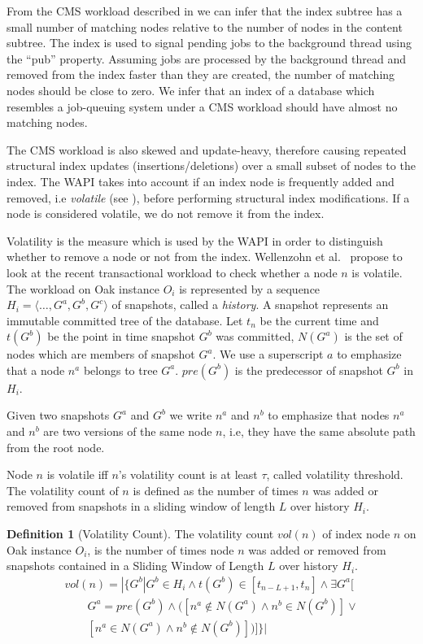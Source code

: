 \documentclass[abstracton,12pt]{scrartcl}
\theoremstyle{definition}
\newtheorem{definition}{Definition}
\begin{document}
From the CMS workload described in  we can infer that the index subtree has a small number of
matching nodes relative to the number of nodes in the content subtree. The index is
 used to signal pending jobs to the background thread using
the ``pub'' property. Assuming jobs are processed by
the background thread and removed from the index faster than they are created,
the number of matching nodes should be close to zero. We infer that an index of
a database which resembles a job-queuing system under a CMS workload should have
almost no matching nodes. 

The CMS workload is also skewed and update-heavy, therefore causing repeated structural index
updates (insertions/deletions) over a small subset of nodes to the index.
The WAPI takes into account if an index node is frequently added and removed,
i.e \textit{volatile} (see ), before performing structural
index modifications. If a node is considered volatile, we do not remove it from the index.

Volatility is the measure which is used by the WAPI in order to distinguish
whether to remove a node or not from the index.
Wellenzohn et al.~\cite{KW17} propose to look at the recent transactional
workload to check whether a node $n$ is volatile. The workload on Oak instance
$O_i$ is represented by a sequence $H_i = \langle \ldots, G^a, G^b, G^c
\rangle$ of snapshots, called a \textit{history}. A snapshot represents an immutable
committed tree of the database. Let $t_n$ be the current time and
$t(G^b)$ be the point in time snapshot $G^b$ was committed, $N(G^a)$ is the
set of nodes which are members of snapshot $G^a$. We use a superscript $a$
to emphasize that a node $n^a$ belongs to tree $G^a$. $pre(G^b)$ is the
predecessor of snapshot $G^b$ in $H_i$.

Given two snapshots $G^a$ and $G^b$ we write $n^a$ and $n^b$ to emphasize that
nodes $n^a$ and $n^b$ are two versions of the same node $n$, i.e, they have
the same absolute path from the root node.

Node $n$ is volatile iff $n$'s volatility count is at least $\tau$, called
volatility threshold. The volatility count of $n$ is defined as the number of
times $n$ was added or removed from snapshots in a sliding window of length
$L$ over history $H_i$.

\begin{definition}[Volatility Count]
  The volatility count $vol(n)$ of index node $n$ on Oak instance $O_i$, is the number of
  times node $n$ was added or removed from snapshots contained in a Sliding
  Window of Length $L$ over history $H_i$.
  \begin{align*}
    vol(n) = | \{ G^b | G^b \in H_i \land t(G^b) \in [t_{n-L+1}, t_n] \land \exists G^a[ \\
    \qquad G^a = pre(G^b) \land ([n^a \notin N(G^a) \land n^b \in N(G^b)]\lor \\
    \qquad [n^a \in N(G^a) \land n^b \notin N(G^b)] )]\} |
  \end{align*}
  \label{def:vol_count}
\end{definition}
\end{document}

